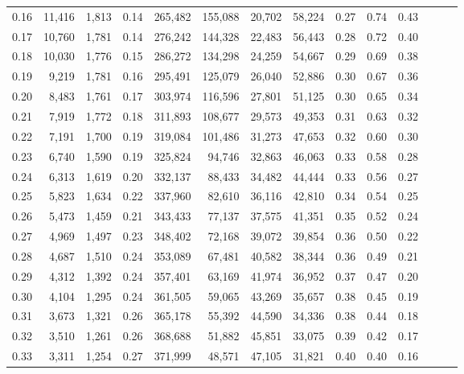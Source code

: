 \begin{tabular}{rrrrrrrrrrrrrr}
0.16 &  11,416 &  1,813 &  0.14 &  265,482 &  155,088 &  20,702 &  58,224 &  0.27 &  0.74 &      0.43 \\
0.17 &  10,760 &  1,781 &  0.14 &  276,242 &  144,328 &  22,483 &  56,443 &  0.28 &  0.72 &      0.40 \\
0.18 &  10,030 &  1,776 &  0.15 &  286,272 &  134,298 &  24,259 &  54,667 &  0.29 &  0.69 &      0.38 \\
0.19 &   9,219 &  1,781 &  0.16 &  295,491 &  125,079 &  26,040 &  52,886 &  0.30 &  0.67 &      0.36 \\
0.20 &   8,483 &  1,761 &  0.17 &  303,974 &  116,596 &  27,801 &  51,125 &  0.30 &  0.65 &      0.34 \\
0.21 &   7,919 &  1,772 &  0.18 &  311,893 &  108,677 &  29,573 &  49,353 &  0.31 &  0.63 &      0.32 \\
0.22 &   7,191 &  1,700 &  0.19 &  319,084 &  101,486 &  31,273 &  47,653 &  0.32 &  0.60 &      0.30 \\
0.23 &   6,740 &  1,590 &  0.19 &  325,824 &   94,746 &  32,863 &  46,063 &  0.33 &  0.58 &      0.28 \\
0.24 &   6,313 &  1,619 &  0.20 &  332,137 &   88,433 &  34,482 &  44,444 &  0.33 &  0.56 &      0.27 \\
0.25 &   5,823 &  1,634 &  0.22 &  337,960 &   82,610 &  36,116 &  42,810 &  0.34 &  0.54 &      0.25 \\
0.26 &   5,473 &  1,459 &  0.21 &  343,433 &   77,137 &  37,575 &  41,351 &  0.35 &  0.52 &      0.24 \\
0.27 &   4,969 &  1,497 &  0.23 &  348,402 &   72,168 &  39,072 &  39,854 &  0.36 &  0.50 &      0.22 \\
0.28 &   4,687 &  1,510 &  0.24 &  353,089 &   67,481 &  40,582 &  38,344 &  0.36 &  0.49 &      0.21 \\
0.29 &   4,312 &  1,392 &  0.24 &  357,401 &   63,169 &  41,974 &  36,952 &  0.37 &  0.47 &      0.20 \\
0.30 &   4,104 &  1,295 &  0.24 &  361,505 &   59,065 &  43,269 &  35,657 &  0.38 &  0.45 &      0.19 \\
0.31 &   3,673 &  1,321 &  0.26 &  365,178 &   55,392 &  44,590 &  34,336 &  0.38 &  0.44 &      0.18 \\
0.32 &   3,510 &  1,261 &  0.26 &  368,688 &   51,882 &  45,851 &  33,075 &  0.39 &  0.42 &      0.17 \\
0.33 &   3,311 &  1,254 &  0.27 &  371,999 &   48,571 &  47,105 &  31,821 &  0.40 &  0.40 &      0.16 \\

\end{tabular}
